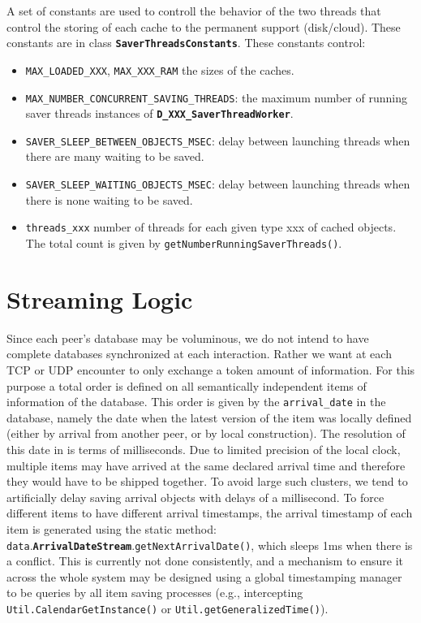 \documentclass{book}
\newcommand{\pkg}[1]{{\tt #1}}
\newcommand{\cls}[1]{{\tt\bf #1}}
\newcommand{\mth}[1]{{\tt #1}}
\newcommand{\mmb}[1]{{\tt #1}}
\begin{document}
A set of constants are used to controll the behavior of the two threads that control the storing of each cache to the
permanent support (disk/cloud).
These constants are in class \cls{SaverThreadsConstants}. These constants control:
\begin{itemize}
\item
\mmb{MAX\_LOADED\_XXX}, \mmb{MAX\_XXX\_RAM}
 the sizes of the caches.
\item
\mmb{MAX\_NUMBER\_CONCURRENT\_SAVING\_THREADS}:
 the maximum number of running saver threads instances of \cls{D\_XXX\_SaverThreadWorker}.
\item
\mmb{SAVER\_SLEEP\_BETWEEN\_OBJECTS\_MSEC}: delay between launching threads when there are many waiting to be saved.
\item
\mmb{SAVER\_SLEEP\_WAITING\_OBJECTS\_MSEC}: delay between launching threads when there is none waiting to be saved.
\item
\mmb{threads\_xxx} number of threads for each given type xxx of cached objects. The total count is given by \mth{getNumberRunningSaverThreads()}.
\end{itemize}

\chapter{Streaming Logic}

Since each peer's database may be voluminous, we do not intend to have complete databases synchronized
at each interaction.
Rather we want at each TCP or UDP encounter to only exchange a token amount of information. For this purpose
a total order is defined on all semantically independent items of information of the database. This order is given by the
\mmb{arrival\_date} in the database, namely the date when the latest version of the item was locally defined (either by arrival 
from another peer, or by local construction). The resolution of this date in is terms of milliseconds. Due to limited precision
of the local clock, multiple items may have arrived at the same declared arrival time and therefore they would
have to be shipped together. To avoid large such clusters, we tend to artificially delay saving arrival objects with delays of a millisecond.
To force different items to have different arrival timestamps, the arrival timestamp of each item is generated using the
static method: \pkg{data}.\cls{ArrivalDateStream}.\mth{getNextArrivalDate()}, which sleeps 1ms when there is a conflict.
This is currently not done consistently, and a mechanism to ensure it across the whole system may be designed using
a global timestamping manager to be queries by all item saving processes (e.g., intercepting \mth{Util.CalendarGetInstance()} or \mth{Util.getGeneralizedTime()}).
 
\end{document}
